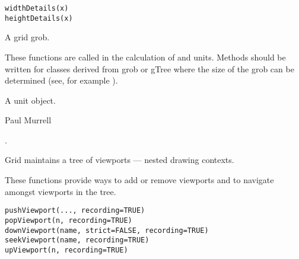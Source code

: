 %
\begin{Usage}
\begin{verbatim}
widthDetails(x)
heightDetails(x)
\end{verbatim}
\end{Usage}
%
\begin{Arguments}
\begin{ldescription}
\item[\code{x}]  A grid grob. 
\end{ldescription}
\end{Arguments}
%
\begin{Details}\relax
These functions are called in the calculation of
 and  units.
Methods should be written for classes derived from grob or gTree
where the size of the grob can be determined (see, for example
).
\end{Details}
%
\begin{Value}
A unit object.
\end{Value}
%
\begin{Author}\relax
 Paul Murrell 
\end{Author}
%
\begin{SeeAlso}\relax
{}.
\end{SeeAlso}
%
\begin{Description}\relax
Grid maintains a tree of viewports --- nested drawing
contexts. 

These functions provide ways to add or remove viewports
and to navigate amongst viewports in the tree.
\end{Description}
%
\begin{Usage}
\begin{verbatim}
pushViewport(..., recording=TRUE)
popViewport(n, recording=TRUE)
downViewport(name, strict=FALSE, recording=TRUE)
seekViewport(name, recording=TRUE)
upViewport(n, recording=TRUE)
\end{verbatim}
\end{Usage}
%
